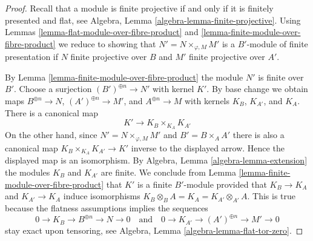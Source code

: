 \documentclass[10pt,a4paper]{amsart}
\theoremstyle{plain}
\theoremstyle{definition}
\theoremstyle{remark}
\numberwithin{equation}{subsection}
\begin{document}
\begin{proof}
Recall that a module is finite projective if and only if
it is finitely presented and flat, see
Algebra, Lemma \ref{algebra-lemma-finite-projective}.
Using Lemmas \ref{lemma-flat-module-over-fibre-product} and
\ref{lemma-finite-module-over-fibre-product}
we reduce to showing that $N' = N \times_{\varphi, M} M'$ is
a $B'$-module of finite presentation if
$N$ finite projective over $B$
and $M'$ finite projective over $A'$.

\medskip\noindent
By Lemma \ref{lemma-finite-module-over-fibre-product}
the module $N'$ is finite over $B'$. Choose a surjection
$(B')^{\oplus n} \to N'$ with kernel $K'$. By base change we obtain maps
$B^{\oplus n} \to N$, $(A')^{\oplus n} \to M'$, and $A^{\oplus n} \to M$
with kernels $K_B$, $K_{A'}$, and $K_A$. There is a canonical map
$$
K' \longrightarrow K_B \times_{K_A} K_{A'}
$$
On the other hand, since $N' = N \times_{\varphi, M} M'$ and
$B' = B \times_A A'$ there is also a
canonical map $K_B \times_{K_A} K_{A'} \to K'$ inverse to the displayed
arrow. Hence the displayed map is an isomorphism. By
Algebra, Lemma \ref{algebra-lemma-extension}
the modules $K_B$ and $K_{A'}$ are finite. We conclude from
Lemma \ref{lemma-finite-module-over-fibre-product}
that $K'$ is a finite $B'$-module provided that $K_B \to K_A$ and
$K_{A'} \to K_A$ induce isomorphisms
$K_B \otimes_B A = K_A = K_{A'} \otimes_{A'} A$.
This is true because the flatness assumptions implies the sequences
$$
0 \to K_B \to B^{\oplus n} \to N \to 0
\quad\text{and}\quad
0 \to K_{A'} \to (A')^{\oplus n} \to M' \to 0
$$
stay exact upon tensoring, see
Algebra, Lemma \ref{algebra-lemma-flat-tor-zero}.
\end{proof}
\end{document}
